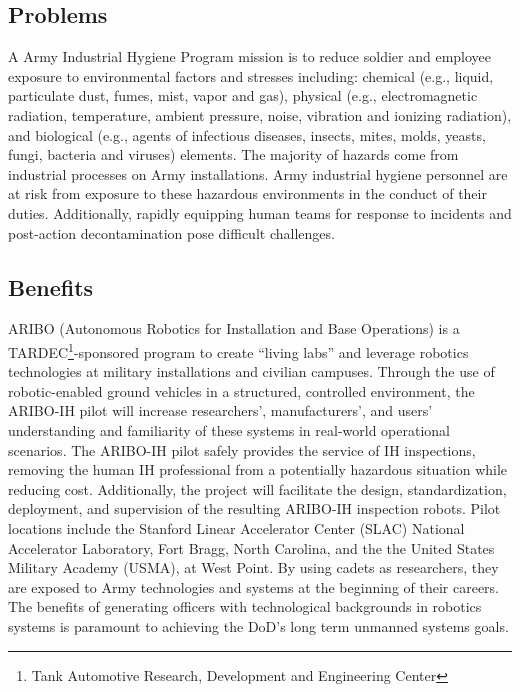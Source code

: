 \subsection{Problems}

A Army Industrial Hygiene Program mission is to reduce soldier and employee exposure to environmental factors and stresses including:  chemical (e.g., liquid, particulate dust, fumes, mist, vapor and gas), physical (e.g., electromagnetic radiation, temperature, ambient pressure, noise, vibration and ionizing radiation), and biological (e.g., agents of infectious diseases, insects, mites, molds, yeasts, fungi, bacteria and viruses) elements\cite{ArmymedPAM40_503}. The majority of hazards come from industrial processes on Army installations. Army industrial hygiene personnel are at risk from exposure to these hazardous environments in the conduct of their duties. Additionally, rapidly equipping human teams for response to incidents and post-action decontamination pose difficult challenges.  

\subsection{Benefits}

ARIBO (Autonomous Robotics for Installation and Base Operations) is a TARDEC\footnote{Tank Automotive Research, Development and Engineering Center}-sponsored program to create ``living labs'' and leverage robotics technologies at military installations and civilian campuses. Through the use of robotic-enabled ground vehicles in a structured, controlled environment, the ARIBO-IH pilot will increase researchers’, manufacturers’, and users’ understanding and familiarity of these systems in real-world operational scenarios. The ARIBO-IH pilot safely provides the service of IH inspections, removing the human IH professional from a potentially hazardous situation while reducing cost. Additionally, the project will facilitate the design, standardization, deployment, and supervision of the resulting ARIBO-IH inspection robots. Pilot locations include the Stanford Linear Accelerator Center (SLAC) National Accelerator Laboratory, Fort Bragg, North Carolina, and the the United States Military Academy (USMA), at West Point. By using cadets as researchers, they are exposed to Army technologies and systems at the beginning of their careers. The benefits of generating officers with technological backgrounds in robotics systems is paramount to achieving the DoD’s long term unmanned systems goals.

